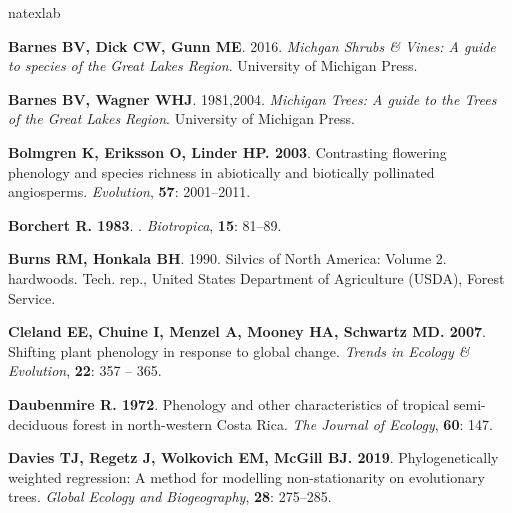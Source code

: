 \documentclass[11pt]{article}
\begin{document}
%
\begin{thebibliography}{39}
\expandafter\ifx\csname natexlab\endcsname\relax\def\natexlab#1{#1}\fi

{\bf Barnes BV, Dick CW, Gunn ME}. 2016.
\newblock \emph{Michgan Shrubs & Vines: A guide to species of the Great Lakes
  Region}.
\newblock University of Michigan Press.

{\bf Barnes BV, Wagner WHJ}. 1981,2004.
\newblock \emph{Michigan Trees: A guide to the Trees of the Great Lakes
  Region}.
\newblock University of Michigan Press.

{\bf Bolmgren K, Eriksson O, Linder HP}{\bf . 2003}.
\newblock Contrasting flowering phenology and species richness in abiotically
  and biotically pollinated angiosperms.
\newblock \emph{Evolution}, {\bf 57}: 2001--2011.

{\bf Borchert R}{\bf . {1983}}.
.
\newblock \emph{{Biotropica}}, {\bf {15}}: {81--89}.

{\bf Burns RM, Honkala BH}. 1990.
\newblock Silvics of North America: Volume 2. hardwoods.
\newblock Tech. rep., United States Department of Agriculture (USDA), Forest
  Service.

{\bf Cleland EE, Chuine I, Menzel A, Mooney HA, Schwartz MD}{\bf . 2007}.
\newblock Shifting plant phenology in response to global change.
\newblock \emph{Trends in Ecology & Evolution}, {\bf 22}: 357 -- 365.

{\bf Daubenmire R}{\bf . 1972}.
\newblock Phenology and other characteristics of tropical semi-deciduous forest
  in north-western Costa Rica.
\newblock \emph{The Journal of Ecology}, {\bf 60}: 147.

{\bf Davies TJ, Regetz J, Wolkovich EM, McGill BJ}{\bf . 2019}.
\newblock Phylogenetically weighted regression: A method for modelling
  non-stationarity on evolutionary trees.
\newblock \emph{Global Ecology and Biogeography}, {\bf 28}: 275--285.


\end{thebibliography}
\end{document}
